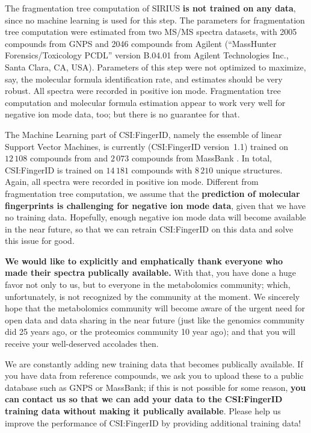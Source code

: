 \documentclass[letterpaper,10pt,openany,oneside]{sphinxmanual}
\begin{document}
The fragmentation tree computation of SIRIUS \textbf{is not trained on any
data}, since no machine learning is used for this step.  The parameters for
fragmentation tree computation were estimated from two MS/MS spectra
datasets, with 2005 compounds from GNPS \citep{wang16sharing} and 2046
compounds from Agilent (``MassHunter Forensics/Toxicology PCDL'' version
B.04.01 from Agilent Technologies Inc., Santa Clara, CA, USA).  Parameters of
this step were not optimized to maximize, say, the molecular formula
identification rate, and estimates should be very robust.  All spectra were
recorded in positive ion mode.  Fragmentation tree computation and molecular
formula estimation appear to work very well for negative ion mode data, too;
but there is no guarantee for that.

The Machine Learning part of CSI:FingerID, namely the essemble of linear
Support Vector Machines, is currently (CSI:FingerID version~1.1) trained
on $12\,108$ compounds from \citep{wang16sharing} and $2\,073$ compounds
from MassBank \citep{horai10massbank}.  In total, CSI:FingerID is trained on
$14\,181$ compounds with $8\,210$ unique structures. Again, all spectra were
recorded in
positive ion mode.  Different from fragmentation tree computation, we assume
that the \textbf{prediction of molecular fingerprints is challenging for
negative ion mode data}, given that we have no training data.  Hopefully,
enough negative ion mode data will become available in the near future, so
that we can retrain CSI:FingerID on this data and solve this issue for good.

\textbf{We would like to explicitly and emphatically thank everyone who made
their spectra publically available.}  With that, you have done a huge favor
not only to us, but to everyone in the metabolomics community; which,
unfortunately, is not recognized by the community at the moment.  We
sincerely hope that the metabolomics community will become aware of the
urgent need for open data and data sharing in the near future (just like the
genomics community did 25 years ago, or the proteomics community 10 year
ago); and that you will receive your well-deserved accolades then.
 
We are constantly adding new training data that becomes publically available.
If you have data from reference compounds, we ask you to upload these to a
public database such as GNPS or MassBank; if this is not possible for some
reason, \textbf{you can contact us so that we can add your data to the
CSI:FingerID training data without making it publically available}.  Please
help us improve the performance of CSI:FingerID by providing additional
training data!
\end{document}
